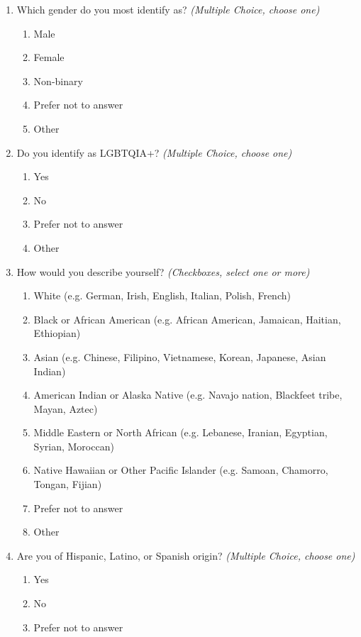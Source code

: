 \begin{enumerate}
    \item Which gender do you most identify as? \textit{(Multiple Choice, choose one)}
    \begin{enumerate}
        \item Male
        \item Female
        \item Non-binary
        \item Prefer not to answer
        \item Other
    \end{enumerate}

    \item Do you identify as LGBTQIA+? \textit{(Multiple Choice, choose one)}
    \begin{enumerate}
        \item Yes
        \item No
        \item Prefer not to answer
        \item Other
    \end{enumerate}

    \item How would you describe yourself? \textit{(Checkboxes, select one or more)}
    \begin{enumerate}
        \item White (e.g. German, Irish, English, Italian, Polish, French)
        \item Black or African American (e.g. African American, Jamaican, Haitian, Ethiopian)
        \item Asian (e.g. Chinese, Filipino, Vietnamese, Korean, Japanese, Asian Indian)
        \item American Indian or Alaska Native (e.g. Navajo nation, Blackfeet tribe, Mayan, Aztec)
        \item Middle Eastern or North African (e.g. Lebanese, Iranian, Egyptian, Syrian, Moroccan)
        \item Native Hawaiian or Other Pacific Islander (e.g. Samoan, Chamorro, Tongan, Fijian)
        \item Prefer not to answer
        \item Other
    \end{enumerate}

    \item Are you of Hispanic, Latino, or Spanish origin? \textit{(Multiple Choice, choose one)}
    \begin{enumerate}
        \item Yes
        \item No
        \item Prefer not to answer
    \end{enumerate}
\end{enumerate}